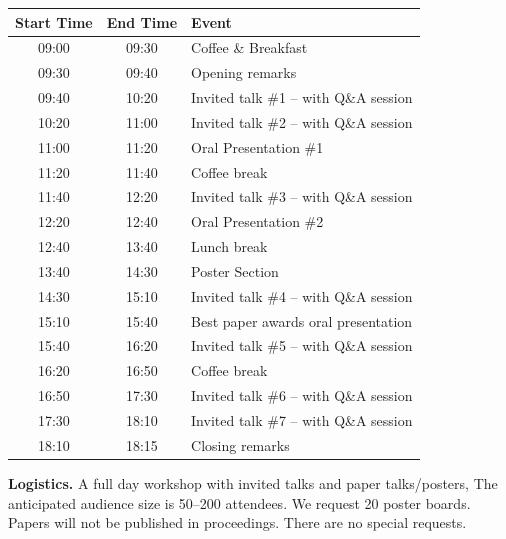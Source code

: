 \documentclass[runningheads]{llncs}
\begin{document}
\begin{table}[h]
    \scriptsize
    \centering

    \vspace{-2.15em}
    \begin{tabular}{c|c|l}
            
            \toprule
       Start Time & End Time & Event \\
        \midrule    
         09:00&09:30& Coffee \& Breakfast\\
         09:30&09:40 & Opening remarks\\
         09:40&10:20&  Invited talk \#1 – with Q\&A session\\
         10:20&11:00& Invited talk \#2 – with Q\&A session \\
         11:00&11:20& Oral Presentation \#1 \\
         11:20&11:40& Coffee break\\
         11:40&12:20 & Invited talk \#3 – with Q\&A session\\
         12:20&12:40& Oral Presentation \#2\\
         12:40&13:40& Lunch break\\
         13:40&14:30& Poster Section\\
         14:30&15:10 &Invited talk \#4 – with Q\&A session\\
         15:10&15:40& Best paper awards oral presentation\\
         15:40&16:20 & Invited talk \#5 – with Q\&A session\\
         16:20&16:50& Coffee break\\
         16:50&17:30 & Invited talk \#6 – with Q\&A session\\
         17:30&18:10 & Invited talk \#7 – with Q\&A session\\
         18:10&18:15& Closing remarks\\
     \bottomrule
    \end{tabular}
    \label{tab:schedule}
    \vspace{-1.7em}
\end{table}

\textbf{Logistics.} 
A full day workshop with invited talks and paper talks/posters, 
The anticipated audience size is 50--200 attendees. 
We request 20 poster boards. 
Papers will not be published in proceedings. There are no special requests.
\end{document}
